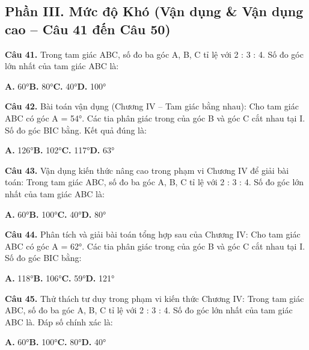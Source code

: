 \documentclass[11pt,a4paper]{article}
\begin{document}
\subsection*{\color{accent} Phần III. Mức độ Khó (Vận dụng \& Vận dụng cao -- Câu 41 đến Câu 50)}
\textbf{\color{primary} Câu 41.} Trong tam giác ABC, số đo ba góc A, B, C tỉ lệ với 2 : 3 : 4. Số đo góc lớn nhất của tam giác ABC là:\par
\hspace*{1.5em}\textbf{A.} 60°\quad\quad \textbf{B.} 80°\quad\quad \textbf{C.} 40°\quad\quad \textbf{D.} 100°\par\vspace{2pt}
\textbf{\color{primary} Câu 42.} Bài toán vận dụng (Chương IV – Tam giác bằng nhau): Cho tam giác ABC có góc A = 54°. Các tia phân giác trong của góc B và góc C cắt nhau tại I. Số đo góc BIC bằng. Kết quả đúng là:\par
\hspace*{1.5em}\textbf{A.} 126°\quad\quad \textbf{B.} 102°\quad\quad \textbf{C.} 117°\quad\quad \textbf{D.} 63°\par\vspace{2pt}
\textbf{\color{primary} Câu 43.} Vận dụng kiến thức nâng cao trong phạm vi Chương IV để giải bài toán: Trong tam giác ABC, số đo ba góc A, B, C tỉ lệ với 2 : 3 : 4. Số đo góc lớn nhất của tam giác ABC là:\par
\hspace*{1.5em}\textbf{A.} 60°\quad\quad \textbf{B.} 100°\quad\quad \textbf{C.} 40°\quad\quad \textbf{D.} 80°\par\vspace{2pt}
\textbf{\color{primary} Câu 44.} Phân tích và giải bài toán tổng hợp sau của Chương IV: Cho tam giác ABC có góc A = 62°. Các tia phân giác trong của góc B và góc C cắt nhau tại I. Số đo góc BIC bằng:\par
\hspace*{1.5em}\textbf{A.} 118°\quad\quad \textbf{B.} 106°\quad\quad \textbf{C.} 59°\quad\quad \textbf{D.} 121°\par\vspace{2pt}
\textbf{\color{primary} Câu 45.} Thử thách tư duy trong phạm vi kiến thức Chương IV: Trong tam giác ABC, số đo ba góc A, B, C tỉ lệ với 2 : 3 : 4. Số đo góc lớn nhất của tam giác ABC là. Đáp số chính xác là:\par
\hspace*{1.5em}\textbf{A.} 60°\quad\quad \textbf{B.} 100°\quad\quad \textbf{C.} 80°\quad\quad \textbf{D.} 40°\par\vspace{2pt}
\end{document}
